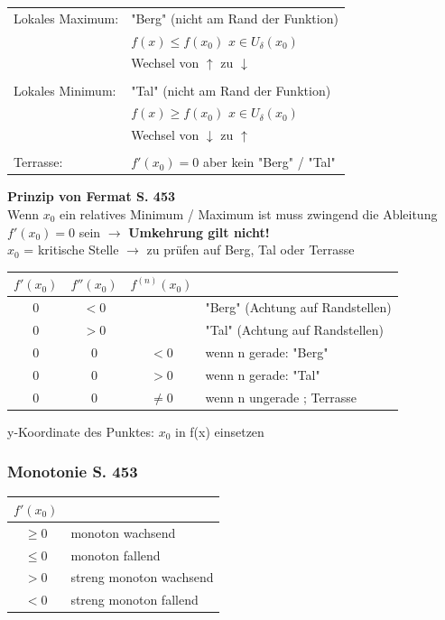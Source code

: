 			\begin{tabular}{ll}
			Lokales Maximum: & "Berg" (nicht am Rand der Funktion)\\ 
			& $f(x) \leq f(x_0) $ \quad $x \in U_{\delta}(x_0)$  \\
			&Wechsel von $\uparrow$ zu $\downarrow$ \\
			\\
			Lokales Minimum: & "Tal" (nicht am Rand der Funktion)\\
			& $f(x) \geq f(x_0) $ \quad $x \in U_{\delta}(x_0)$ \\
			& Wechsel von $\downarrow$ zu $\uparrow$ \\
			\\	
			Terrasse: & $f'(x_0) = 0$ aber kein "Berg" / "Tal" \\ 
			\end{tabular}
			
			
			\textbf{Prinzip von Fermat S. 453}	\\
			Wenn $x_0$ ein relatives Minimum / Maximum ist muss zwingend die Ableitung $f'(x_0) = 0$ sein	 $\rightarrow$ \textbf{Umkehrung gilt nicht!}\\
			$x_0$ = kritische Stelle $\rightarrow$ zu prüfen auf Berg, Tal oder Terrasse \\
			
			\begin{tabular}{| c | c | c | l |}
			\hline
			$f'(x_0)$ & $f''(x_0)$ & $f^{(n)}(x_0)$ & \\
			\hline
			0 & $< 0$ &  & "Berg" (Achtung auf Randstellen) \\
			\hline
			0 & $> 0$ & & "Tal" (Achtung auf Randstellen) \\
			\hline
			0 & 0 & $< 0$ & wenn n gerade: "Berg" \\
			\hline
			0 & 0 & $> 0$ & wenn n gerade: "Tal" \\
			\hline
			0 & 0 & $\neq 0$ & wenn n ungerade ; Terrasse \\
			\hline
			\end{tabular}
			
			\vspace{0.1cm}
			y-Koordinate des Punktes: $x_0$ in f(x) einsetzen					
			
			\subsubsection{Monotonie S. 453}
			\begin{tabular}{| c | l |}
			\hline
			$f'(x_0)$ &  \\
			\hline
			$ \geq 0$  & monoton wachsend \\
			\hline
			$ \leq 0$ & monoton fallend \\
			\hline
			$ > 0$  &  streng monoton wachsend \\
			\hline
			$ < 0$  &  streng monoton fallend \\
			\hline
			\end{tabular}
			
